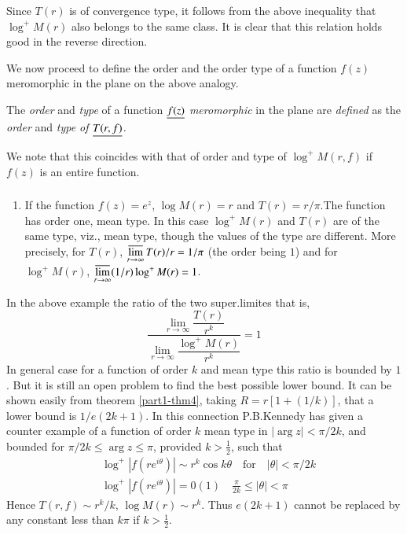 Since $T(r)$ is of convergence type, it follows from the above
inequality that $\log^{+}M(r)$ also belongs to the same class. It is
clear that this relation holds good in the reverse direction.

We now proceed to define the order and the order type of a function
$f(z)$ meromorphic in the plane on the above analogy.

\begin{defi*}
The {\em order} and {\em type} of a function $\underline{f(z)}$ {\em
  meromorphic} in the plane are {\em defined} as the {\em order} and
{\em type of $\underline{T(r,f)}$.} 
\end{defi*}

We note that this coincides with that of order and type of\break
$\log^{+}M(r,f)$ if $f(z)$ is an entire function.

\subsubsection{}\label{part1-subsubsec1.7.2}

\begin{example*}
\begin{enumerate}
\renewcommand{\labelenumi}{(\theenumi)}
\item If the function $f(z)=e^{z}$, $\log M(r)=r$ and
  $T(r)=r/\pi$.\pageoriginale The function has order one, mean
  type. In this case $\log^{+}M(r)$ and $T(r)$ are of the same type,
  viz., mean type, though the values of the type are different. More
  precisely, for $T(r)$,
  $\mathop{\overline{\lim}}\limits_{r\to\infty}T(r)/r=1/\pi$ (the order
  being $1$) and for $\log^{+}M(r)$, $\mathop{\overline{\lim}}\limits_{r\to
    \infty}(1/r)\log^{+}M(r)=1$. 
\end{enumerate}
\end{example*}

In the above example the ratio of the two super.\@ limites that is,
$$
\frac{\lim\limits_{r\to\infty}\dfrac{T(r)}{r^{k}}}{\lim\limits_{r\to
    \infty}\dfrac{\log^{+}M(r)}{r^{k}}}=1 
$$
In general case for a function of order $k$ and mean type this ratio
is bounded by $1$. But it is still an open problem to find the best
possible lower bound. It can be shown easily from theorem
\ref{part1-thm4}, taking \break $R=r[1+(1/k)]$, that a lower bound is
$1/e(2k+1)$. In this connection P.B.\@ Kennedy \cite{1} has given a
counter example of a function of order $k$ mean type in $|\arg
z|<\pi/2k$, and bounded for $\pi/2k\leq \arg z\leq \pi$, provided
$k>\frac{1}{2}$, such that
\begin{align*}
& \log^{+}|f(re^{i\theta})|\sim r^{k}\cos k\theta \quad\text{for}\quad
  |\theta|<\pi/2k\\
& \log^{+}|f(re^{i\theta})|=0(1)\quad \frac{\pi}{2k}\leq |\theta|<\pi
\end{align*}
Hence $T(r,f)\sim r^{k}/k$, $\log M(r)\sim r^{k}$. Thus $e(2k+1)$
cannot be replaced by any constant less than $k\pi$ if $k>\frac{1}{2}$.

